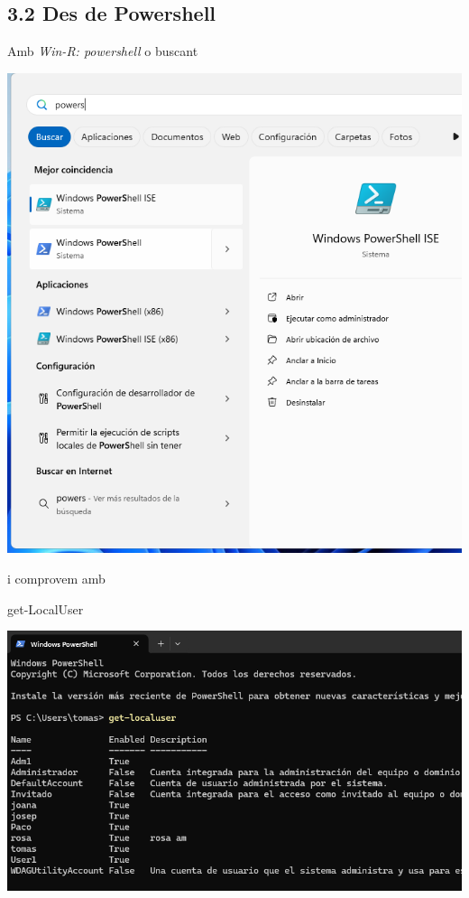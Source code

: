 \documentclass[
  a4paper,
]{article}
\newenvironment{Shaded}{\begin{snugshade}}{\end{snugshade}}
\newcommand{\NormalTok}[1]{#1}
\begin{document}
\subsection{3.2 Des de Powershell}\label{des-de-powershell}

Amb \emph{Win-R: powershell} o buscant

\includegraphics{png/powershell.png}

i comprovem amb

\begin{Shaded}
\begin{Highlighting}[]
\NormalTok{get{-}LocalUser}
\end{Highlighting}
\end{Shaded}

\includegraphics{png/get-LocalUser.png}
\end{document}
